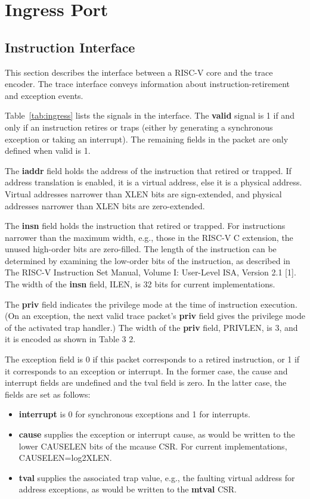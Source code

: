 \chapter{Ingress Port} \label{Interface}

\section{Instruction Interface}
This section describes the interface between a RISC-V core and the
trace encoder. The trace interface conveys information about
instruction-retirement and exception events.

Table~\ref{tab:ingress} lists the signals in the interface. The {\bf
  valid} signal is 1 if and only if an instruction retires or traps
(either by generating a synchronous exception or taking an interrupt).
The remaining fields in the packet are only defined when valid is 1.

The {\bf iaddr} field holds the address of the instruction that retired or
trapped. If address translation is enabled, it is a virtual address,
else it is a physical address. Virtual addresses narrower than XLEN
bits are sign-extended, and physical addresses narrower than XLEN bits
are zero-extended.

The {\bf insn} field holds the instruction that retired or
trapped. For instructions narrower than the maximum width, e.g., those
in the RISC-V C extension, the unused high-order bits are
zero-filled. The length of the instruction can be determined by
examining the low-order bits of the instruction, as described in The
RISC-V Instruction Set Manual, Volume I: User-Level ISA, Version 2.1
[1]. The width of the {\bf insn} field, ILEN, is 32 bits for current
implementations.

The {\bf priv} field indicates the privilege mode at the time of instruction
execution. (On an exception, the next valid trace packet's {\bf priv} field
gives the privilege mode of the activated trap handler.) The width of
the {\bf priv} field, PRIVLEN, is 3, and it is encoded as shown in Table 3
2.

The exception field is 0 if this packet corresponds to a retired
instruction, or 1 if it corresponds to an exception or interrupt.  In
the former case, the cause and interrupt fields are undefined and the
tval field is zero.  In the latter case, the fields are set as
follows:

\begin{itemize}
  \item {\bf interrupt} is 0 for synchronous exceptions and 1 for
    interrupts.
  \item {\bf cause} supplies the exception or interrupt cause, as
    would be written to the lower CAUSELEN bits of the mcause CSR. For
    current implementations, CAUSELEN=log2XLEN.
  \item {\bf tval} supplies the associated trap value, e.g., the
    faulting virtual address for address exceptions, as would be
    written to the {\bf mtval} CSR.
\end{itemize}

